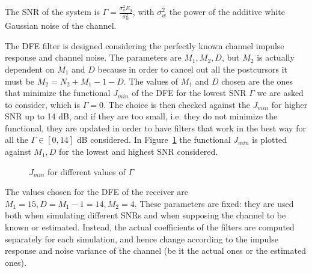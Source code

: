 \documentclass[10pt]{article}
\begin{document}
The SNR of the system is $\Gamma = \frac{\sigma_a^2 E_g}{\sigma_w^2}$, with $\sigma_w^2$ the power of the additive white Gaussian noise of the channel.

The DFE filter is designed considering the perfectly known channel impulse response and channel noise. The parameters are $M_1, M_2, D$, but $M_2$ is actually dependent on $M_1$ and $D$ because in order to cancel out all the postcursors it must be $M_2 = N_2 + M_1 - 1 - D$. The values of $M_1$ and $D$ chosen are the ones
that minimize the functional $J_{min}$ of the DFE for the lowest SNR $\Gamma$ we are asked to consider, which is $\Gamma = 0$. The choice is then checked against the $J_{min}$ for higher SNR up to 14 dB, and if they are too small, i.e. they do not minimize the functional, they are updated in order to have filters that work in the best way for all the $\Gamma \in [0, 14]$ dB considered. In Figure~\ref{fig:jmin_DFE} the functional $J_{min}$ is plotted against $M_1, D$ for the lowest and highest SNR considered. 
\begin{figure}[h!]
	\centering
	\caption{$J_{min}$ for different values of $\Gamma$}
	\label{fig:jmin_DFE}
\end{figure}

The values chosen for the DFE of the receiver are $M_1 = 15, D = M_1 - 1 = 14, M_2 = 4$. These parameters are fixed: they are used both when simulating different SNRs and when supposing the channel to be known or estimated. Instead, the actual coefficients of the filters are computed separately for each simulation, and hence change according to the impulse response and noise variance of the channel (be it the actual ones or the estimated ones).
\end{document}
